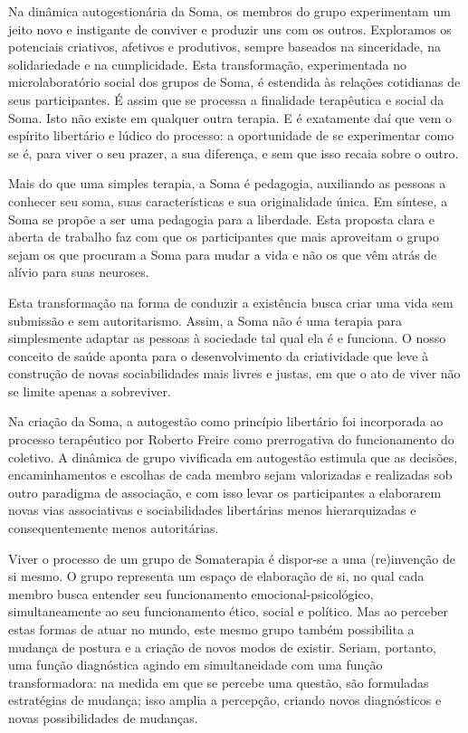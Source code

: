 Na dinâmica autogestionária da Soma, os membros do grupo experimentam um
jeito novo e instigante de conviver e produzir uns com os outros.
Exploramos os potenciais criativos, afetivos e produtivos, sempre
baseados na sinceridade, na solidariedade e na cumplicidade. Esta
transformação, experimentada no microlaboratório social dos grupos de
Soma, é estendida às relações cotidianas de seus participantes. É assim
que se processa a finalidade terapêutica e social da Soma. Isto não
existe em qualquer outra terapia. E é exatamente daí que vem o espírito
libertário e lúdico do processo: a oportunidade de se experimentar como
se é, para viver o seu prazer, a sua diferença, e sem que isso recaia
sobre o outro.

Mais do que uma simples terapia, a Soma é pedagogia, auxiliando as
pessoas a conhecer seu soma, suas características e sua originalidade
única. Em síntese, a Soma se propõe a ser uma pedagogia para a
liberdade. Esta proposta clara e aberta de trabalho faz com que os
participantes que mais aproveitam o grupo sejam os que procuram a Soma
para mudar a vida e não os que vêm atrás de alívio para suas neuroses.

Esta transformação na forma de conduzir a existência busca criar uma
vida sem submissão e sem autoritarismo. Assim, a Soma não é uma terapia
para simplesmente adaptar as pessoas à sociedade tal qual ela é e
funciona. O nosso conceito de saúde aponta para o desenvolvimento da
criatividade que leve à construção de novas sociabilidades mais livres e
justas, em que o ato de viver não se limite apenas a sobreviver.

Na criação da Soma, a autogestão como princípio libertário foi
incorporada ao processo terapêutico por Roberto Freire como prerrogativa
do funcionamento do coletivo. A dinâmica de grupo vivificada em
autogestão estimula que as decisões, encaminhamentos e escolhas de cada
membro sejam valorizadas e realizadas sob outro paradigma de associação,
e com isso levar os participantes a elaborarem novas vias associativas e
sociabilidades libertárias menos hierarquizadas e consequentemente menos
autoritárias.

Viver o processo de um grupo de Somaterapia é dispor-se a uma
(re)invenção de si mesmo. O grupo representa um espaço de elaboração de
si, no qual cada membro busca entender seu funcionamento
emocional-psicológico, simultaneamente ao seu funcionamento ético,
social e político. Mas ao perceber estas formas de atuar no mundo, este
mesmo grupo também possibilita a mudança de postura e a criação de novos
modos de existir. Seriam, portanto, uma função diagnóstica agindo em
simultaneidade com uma função transformadora: na medida em que se
percebe uma questão, são formuladas estratégias de mudança; isso amplia
a percepção, criando novos diagnósticos e novas possibilidades de
mudanças.

